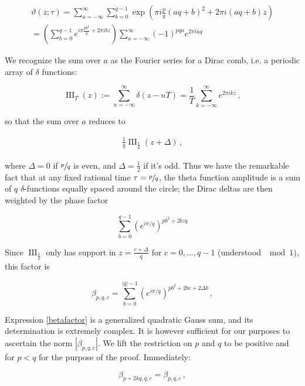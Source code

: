 \documentclass{article}
\newcommand{\T}{\ensuremath{\vartheta}}
\newcommand{\sumZ}{\sum_{n=-\infty}^{\infty}}
\begin{document}
\newcommand{\sumA}{\sum_{a=-\infty}^\infty}
\newcommand{\sumB}{\sum_{b=0}^{q-1}}
\newcommand{\sumBnorm}{\sum_{b=0}^{|q|-1}}
\newcommand{\comb}{\operatorname{III}}

\begin{align}
    \T(z;\tau) = \sumA \sumB \exp(\pi i \frac{p}{q} (aq + b)^2  + 2\pi i (aq+b) z)\\
    = \left( \sumB e^{i\pi \frac{p b^2}{q} + 2\pi i b z} \right) \sumA (-1)^{pqa} e^{2\pi i a q} 
\end{align}

We recognize the sum over $a$ as the Fourier series for a Dirac comb, i.e. a periodic array of $\delta$ functions:

\begin{equation}
    \comb_T(z) := \sumZ \delta(z-nT) = \frac{1}{T} \sum_{k=-\infty}^\infty e^{2\pi i k z}\,,
\end{equation}

so that the sum over $a$ reduces to

\begin{align}
    \frac{1}{q} \comb_{\frac{1}{q}} (z+\Delta)\,,
\end{align}

where $\Delta = 0$ if $\sfrac{p}{q}$ is even, and $\Delta = \frac{1}{2}$ if it's odd. Thus we have the remarkable fact that at any fixed rational time $\tau = \sfrac{p}{q}$, the theta function amplitude is a sum of $q$ $\delta$-functions equally spaced around the circle; the Dirac deltas are then weighted by the phase factor

\begin{equation}
    \sumB \left(e^{i\pi/q}\right)^{pb^2 + 2bzq}
\end{equation}

Since $\comb_{\frac{1}{q}}$ only has support in $z = \frac{c+\Delta}{q}$ for $c = 0,\ldots,q-1$ (understood $\mod 1$), this factor is

\begin{equation}\label{betafactor}
    \beta_{p,q,c} = \sumBnorm \left(e^{i\pi/q}\right)^{pb^2 + 2bc + 2\Delta b}\,,
\end{equation}

Expression \eqref{betafactor} is a generalized quadratic Gauss sum, and its determination is extremely complex. It is however sufficient for our purposes to ascertain the norm $|\beta_{p,q,c}|$. We lift the restriction on $p$ and $q$ to be positive and for $p<q$ for the purpose of the proof. Immediately:

\begin{equation}
    \beta_{p+2kq,q,c} = \beta_{p,q,c}\,,
\end{equation}
\end{document}
